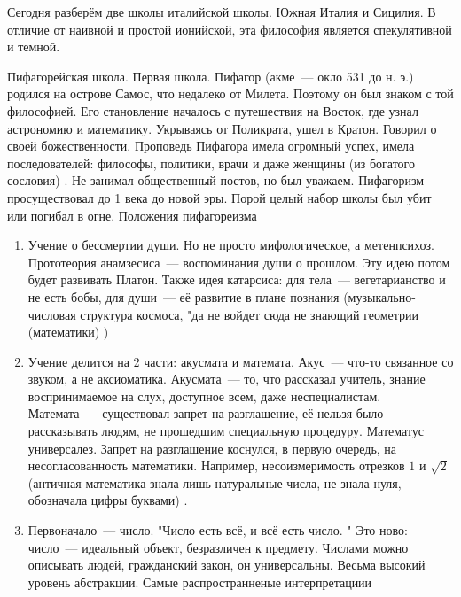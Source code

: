 Сегодня разберём две школы италийской школы. Южная Италия и Сицилия. 
В отличие от наивной и простой ионийской, эта философия является спекулятивной и темной. 

Пифагорейская школа. 
Первая школа. 
Пифагор (акме~--- окло 531 до н. э.) родился на острове Самос, что недалеко от Милета. Поэтому он был знаком с той философией. 
Его становление началось с путешествия на Восток, где узнал астрономию и математику. Укрываясь от Поликрата, ушел в Кратон. Говорил о своей божественности. 
Проповедь Пифагора имела огромный успех, имела последователей: философы, политики, врачи и даже женщины (из богатого сословия) . Не занимал общественный постов, но был уважаем. 
Пифагоризм просуществовал до 1 века до новой эры. Порой целый набор школы был убит или погибал в огне. 
Положения пифагореизма

\begin{enumerate}
	\item Учение о бессмертии души. Но не просто мифологическое, а метенпсихоз. Прототеория анамзесиса~--- воспоминания души о прошлом. Эту идею потом будет развивать Платон. 
	Также идея катарсиса: для тела~--- вегетарианство и не есть бобы, для души~--- её развитие в плане познания (музыкально-числовая структура космоса, "да не войдет сюда не знающий геометрии (математики) ) 
	\item Учение делится на 2 части: акусмата и математа. Акус~--- что-то связанное со звуком, а не аксиоматика. Акусмата~--- то, что рассказал учитель, знание воспринимаемое на слух, доступное всем, даже неспециалистам. Математа~--- существовал запрет на разглашение, её нельзя было рассказывать людям, не прошедшим специальную процедуру. 
	Математус универсалез. Запрет на разглашение коснулся, в первую очередь, на несогласованность математики. 
	Например, несоизмеримость отрезков $1$ и $\sqrt{2}$ (античная математика знала лишь натуральные числа, не знала нуля, обозначала цифры буквами) . 
	\item Первоначало~--- число. "Число есть всё, и всё есть число. " Это ново: число~--- идеальный объект, безразличен к предмету. 
	Числами можно описывать людей, гражданский закон, он универсальны. Весьма высокий уровень абстракции. Самые распространненые интерпретациии
\end{enumerate}

